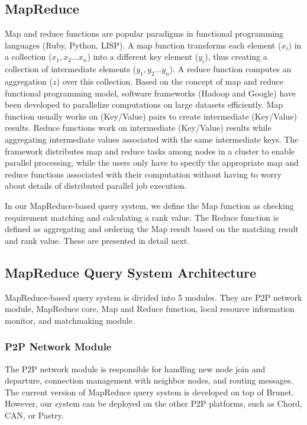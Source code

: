 \documentclass{acm_proc_article-sp}
\begin{document}
\subsection{MapReduce}
Map and reduce functions are popular paradigms in functional programming languages (Ruby, Python, LISP). 
A map function transforms each element ($x_i$) in a collection ({$x_1, x_2... x_n$}) into a different key element ($y_i$), thus creating a collection of intermediate elements ({$y_1, y_2... y_n$}).
A reduce function computes an aggregation ($z$) over this collection. 
Based on the concept of map and reduce functional programming model, software frameworks (Hadoop\cite{hadoop} and Google\cite{google_mapreduce}) have been developed to parallelize computations on large datasets efficiently. 
Map function usually works on (Key/Value) pairs to create intermediate (Key/Value) results. 
Reduce functions work on intermediate (Key/Value) results while aggregating intermediate values associated with the same intermediate keys. 
The framework distributes map and reduce tasks among nodes in a cluster to enable parallel processing, while the users only have to specify the appropriate map and reduce functions associated with their computation without having to worry about details of distributed parallel job execution.  

In our MapReduce-based query system, we define the Map function as checking requirement matching and calculating a rank value. The Reduce function is defined as 
aggregating and ordering the Map result based on the matching result and rank value. These are presented in detail next.

\subsection{MapReduce Query System Architecture}
MapReduce-based query system is divided into 5 modules. They are P2P network module, MapReduce core, Map and Reduce function, local resource information monitor, and matchmaking module.
\subsubsection{P2P Network Module}
The P2P network module is responsible for handling new node join and departure, connection management with neighbor nodes, and routing messages. 
The current version of MapReduce query system is developed on top of Brunet\cite{brunet}.
However, our system can be deployed on the other P2P platforms, such as Chord\cite{chord}, CAN\cite{can}, or Pastry\cite{pastry}.
\end{document}
